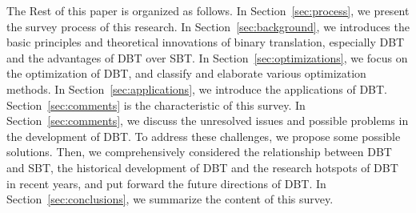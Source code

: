 The Rest of this paper is organized as follows.
In Section~\ref{sec:process}, we present the survey process of this research.
In Section~\ref{sec:background}, we introduces the basic principles and theoretical innovations of binary translation, especially DBT and the advantages of DBT over SBT.
In Section~\ref{sec:optimizations}, we focus on the optimization of DBT, and classify and elaborate various optimization methods.
In Section~\ref{sec:applications}, we introduce the applications of DBT.
Section~\ref{sec:comments} is the characteristic of this survey.
In Section~\ref{sec:comments}, we discuss the unresolved issues and possible problems in the development of DBT.
To address these challenges, we propose some possible solutions.
Then, we comprehensively considered the relationship between DBT and SBT, the historical development of DBT and the research hotspots of DBT in recent years, and put forward the future directions of DBT.
In Section~\ref{sec:conclusions}, we summarize the content of this survey.

